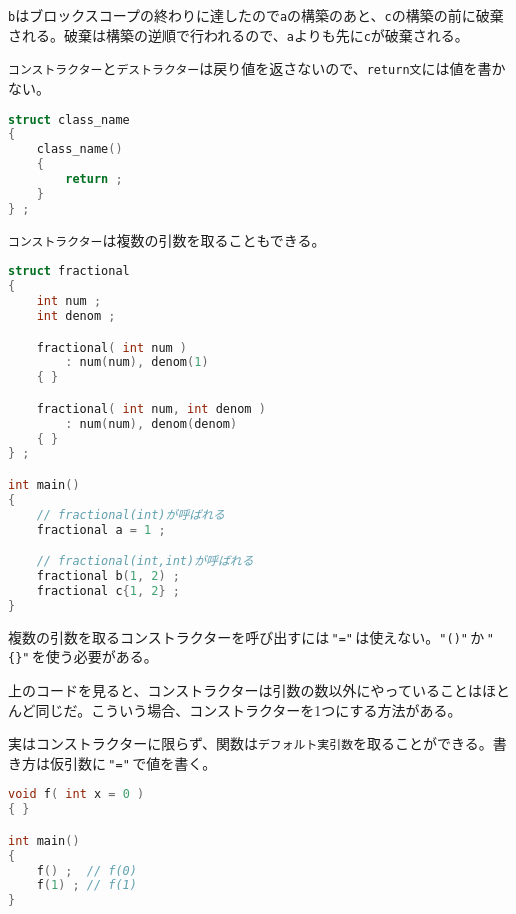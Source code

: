 \texttt{b}はブロックスコープの終わりに達したので\texttt{a}の構築のあと、\texttt{c}の構築の前に破棄される。破棄は構築の逆順で行われるので、\texttt{a}よりも先に\texttt{c}が破棄される。

\texttt{コンストラクター}と\texttt{デストラクター}は戻り値を返さないので、\texttt{return文}には値を書かない。

\begin{lstlisting}[language={C++}]
struct class_name
{
    class_name()
    {
        return ;
    }
} ;
\end{lstlisting}

\texttt{コンストラクター}は複数の引数を取ることもできる。

\begin{lstlisting}[language={C++}]
struct fractional
{
    int num ;
    int denom ;

    fractional( int num )
        : num(num), denom(1)
    { }

    fractional( int num, int denom )
        : num(num), denom(denom)
    { }
} ;

int main()
{
    // fractional(int)が呼ばれる
    fractional a = 1 ;

    // fractional(int,int)が呼ばれる
    fractional b(1, 2) ;
    fractional c{1, 2} ;
}
\end{lstlisting}

複数の引数を取るコンストラクターを呼び出すには\,\texttt{"="}\,は使えない。\texttt{"()"}\,か\,\texttt{"\{\}"}\,を使う必要がある。

上のコードを見ると、コンストラクターは引数の数以外にやっていることはほとんど同じだ。こういう場合、コンストラクターを1つにする方法がある。

実はコンストラクターに限らず、関数は\texttt{デフォルト実引数}を取ることができる。書き方は仮引数に\,\texttt{"="}\,で値を書く。

\ifTombow\pagebreak\fi
\begin{lstlisting}[language={C++}]
void f( int x = 0 )
{ }

int main()
{
    f() ;  // f(0)
    f(1) ; // f(1)
}
\end{lstlisting}

